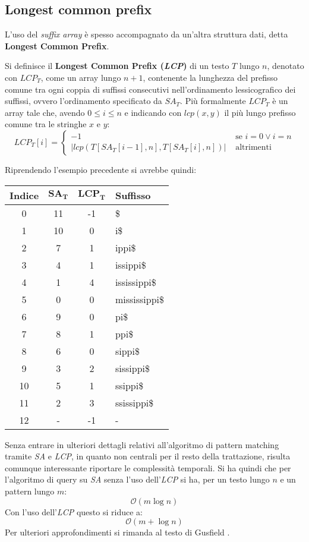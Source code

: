\subsection{Longest common prefix}
L'uso del \textit{suffix array} è spesso accompagnato da un'altra struttura
dati, detta \textbf{Longest Common Prefix}.
\begin{definizione}
  Si definisce il \textbf{Longest Common Prefix (\emph{LCP})} di un testo $T$
  lungo $n$,
  denotato con $LCP_T$, come un array lungo $n+1$, contenente la
  lunghezza del prefisso comune tra ogni coppia di suffissi consecutivi
  nell'ordinamento lessicografico dei suffissi, ovvero l'ordinamento specificato
  da $SA_T$. Più formalmente
  $LCP_T$ è un array tale che, avendo $0\leq i\leq n$ e indicando con $lcp(x,y)$
  il più lungo prefisso comune tra le stringhe $x$ e $y$:
  \[LCP_T[i]=
    \begin{cases}
      -1&\mbox{ se } i=0 \lor i=n\\
      \left|lcp(T[SA_T[i-1], n],T[SA_T [i], n])\right|&\mbox{ altrimenti}
    \end{cases}
  \]
\end{definizione}
\begin{esempio}
  Riprendendo l'esempio precedente si avrebbe quindi:
  \begin{table}[H]
    \centering
    \footnotesize
    \begin{tabular}{c|c|c|l} 
      \textbf{Indice} & $\mathbf{SA_T}$ & $\mathbf{LCP_T}$ & \textbf{Suffisso}\\ 
      \hline
      0 & 11 & -1 & \$\\
      1 & 10 & 0 & i\$\\
      2 & 7 & 1 & ippi\$\\
      3 & 4 & 1 & issippi\$\\
      4 & 1 & 4 & ississippi\$\\
      5 & 0 & 0 & mississippi\$\\
      6 & 9 & 0 & pi\$\\
      7 & 8 & 1 & ppi\$\\
      8 & 6 & 0 & sippi\$\\
      9 & 3 & 2 & sissippi\$\\
      10 & 5 & 1 & ssippi\$\\
      11 & 2 & 3 & ssissippi\$\\
      12 & - & -1 & -
    \end{tabular}
  \end{table}
\end{esempio}
Senza entrare in ulteriori dettagli relativi all'algoritmo di pattern matching
tramite \textit{SA} e \textit{LCP}, in quanto non centrali per il resto della
trattazione, risulta comunque interessante riportare le complessità
temporali. Si ha quindi che per l'algoritmo di query su \textit{SA} senza l'uso
dell'\textit{LCP} si ha, per un testo lungo $n$ e un pattern lungo $m$:
\[\mathcal{O}(m\log n)\]
Con l'uso dell'\textit{LCP} questo si riduce a:
\[\mathcal{O}(m+\log n)\]
Per ulteriori approfondimenti si rimanda al testo di Gusfield
\cite{gusfield1997}.
